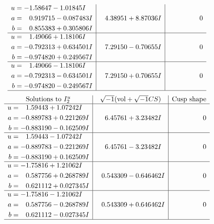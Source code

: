 \documentclass[1p]{elsarticle_modified}
\theoremstyle{definition}
\newcommand{\I}{\sqrt{-1}}
\begin{document}
$$\begin{array}{c|c|c}
\begin{aligned}
u &= -1.58647 - 1.01845 I \\
a &= \phantom{-}0.919715 - 0.087483 I \\
b &= \phantom{-}0.855383 + 0.305806 I\end{aligned}
 & \phantom{-}4.38951 + 8.87036 I & \phantom{-0.000000 } 0 \\ \hline\begin{aligned}
u &= \phantom{-}1.49066 + 1.18106 I \\
a &= -0.792313 + 0.634501 I \\
b &= -0.974820 + 0.249567 I\end{aligned}
 & \phantom{-}7.29150 - 0.70655 I & \phantom{-0.000000 } 0 \\ \hline\begin{aligned}
u &= \phantom{-}1.49066 - 1.18106 I \\
a &= -0.792313 - 0.634501 I \\
b &= -0.974820 - 0.249567 I\end{aligned}
 & \phantom{-}7.29150 + 0.70655 I & \phantom{-0.000000 } 0\\
 \hline 
 \end{array}$$\newpage$$\begin{array}{c|c|c}  
\text{Solutions to }I^u_{2}& \I (\text{vol} + \sqrt{-1}CS) & \text{Cusp shape}\\
 \hline 
\begin{aligned}
u &= \phantom{-}1.59443 + 1.07242 I \\
a &= -0.889783 + 0.221269 I \\
b &= -0.883190 - 0.162509 I\end{aligned}
 & \phantom{-}6.45761 + 3.23482 I & \phantom{-0.000000 } 0 \\ \hline\begin{aligned}
u &= \phantom{-}1.59443 - 1.07242 I \\
a &= -0.889783 - 0.221269 I \\
b &= -0.883190 + 0.162509 I\end{aligned}
 & \phantom{-}6.45761 - 3.23482 I & \phantom{-0.000000 } 0 \\ \hline\begin{aligned}
u &= -1.75816 + 1.21062 I \\
a &= \phantom{-}0.587756 + 0.268789 I \\
b &= \phantom{-}0.621112 + 0.027345 I\end{aligned}
 & \phantom{-}0.543309 - 0.646462 I & \phantom{-0.000000 } 0 \\ \hline\begin{aligned}
u &= -1.75816 - 1.21062 I \\
a &= \phantom{-}0.587756 - 0.268789 I \\
b &= \phantom{-}0.621112 - 0.027345 I\end{aligned}
 & \phantom{-}0.543309 + 0.646462 I & \phantom{-0.000000 } 0\\
 \hline 
 \end{array}$$\newpage\newpage\renewcommand{\arraystretch}{1}
\end{document}

